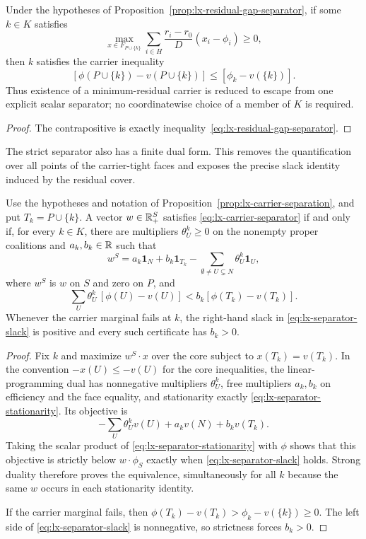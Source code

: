 \begin{corollary}
\label{cor:lx-residual-gap-escape}
Under the hypotheses of Proposition~\ref{prop:lx-residual-gap-separator}, if
some $k\in K$ satisfies
\[
 \max_{x\in F_{P\cup\{k\}}}
 \sum_{i\in H}\frac{r_i-r_0}{D}(x_i-\phi_i)\geq0,
 \tag{E}\label{eq:lx-residual-gap-escape}
\]
then $k$ satisfies the carrier inequality
\[
 [\phi(P\cup\{k\})-v(P\cup\{k\})]
 \leq[\phi_k-v(\{k\})].
\]
Thus existence of a minimum-residual carrier is reduced to escape from one
explicit scalar separator; no coordinatewise choice of a member of $K$ is
required.
\end{corollary}

\begin{proof}
The contrapositive is exactly inequality~\eqref{eq:lx-residual-gap-separator}.
\end{proof}

The strict separator also has a finite dual form.  This removes the
quantification over all points of the carrier-tight faces and exposes the
precise slack identity induced by the residual cover.

\begin{proposition}
\label{prop:lx-carrier-separator-dual}
Use the hypotheses and notation of
Proposition~\ref{prop:lx-carrier-separation}, and put
$T_k=P\cup\{k\}$.  A vector $w\in\mathbb{R}^S_+$ satisfies
\eqref{eq:lx-carrier-separator} if and only if, for every $k\in K$, there
are multipliers $\theta^k_U\geq0$ on the nonempty proper coalitions and
$a_k,b_k\in\mathbb{R}$ such that
\[
 w^S=a_k\mathbf1_N+b_k\mathbf1_{T_k}
          -\sum_{\emptyset\ne U\subsetneq N}
             \theta^k_U\mathbf1_U,
 \tag{D1}\label{eq:lx-separator-stationarity}
\]
where $w^S$ is $w$ on $S$ and zero on $P$, and
\[
 \sum_U\theta^k_U\,[\phi(U)-v(U)]
   < b_k[\phi(T_k)-v(T_k)].
 \tag{D2}\label{eq:lx-separator-slack}
\]
Whenever the carrier marginal fails at $k$, the right-hand slack in
\eqref{eq:lx-separator-slack} is positive and every such certificate has
$b_k>0$.
\end{proposition}

\begin{proof}
Fix $k$ and maximize $w^S\!\cdot x$ over the core subject to
$x(T_k)=v(T_k)$.  In the convention $-x(U)\leq-v(U)$ for the core
inequalities, the linear-programming dual has nonnegative multipliers
$\theta^k_U$, free multipliers $a_k,b_k$ on efficiency and the face
equality, and stationarity exactly
\eqref{eq:lx-separator-stationarity}.  Its objective is
\[
 -\sum_U\theta^k_Uv(U)+a_kv(N)+b_kv(T_k).
\]
Taking the scalar product of
\eqref{eq:lx-separator-stationarity} with $\phi$ shows that this objective
is strictly below $w\cdot\phi_S$ exactly when
\eqref{eq:lx-separator-slack} holds.  Strong duality therefore proves the
equivalence, simultaneously for all $k$ because the same $w$ occurs in
each stationarity identity.

If the carrier marginal fails, then
$\phi(T_k)-v(T_k)>\phi_k-v(\{k\})\geq0$.  The left side of
\eqref{eq:lx-separator-slack} is nonnegative, so strictness forces
$b_k>0$.
\end{proof}

